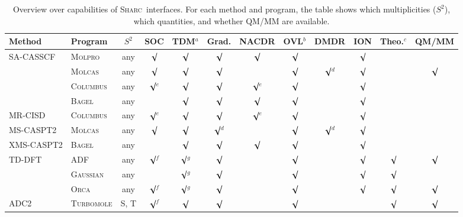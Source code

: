 \documentclass[a4paper,10pt,DIV=15,openany]{scrbook}
\newcommand{\sharc}{\textsc{Sharc}}
\begin{document}
\begin{table}[htb]
  \newcommand{\chk}{\ensuremath{\surd}}
  \renewcommand{\tabcolsep}{4.5pt}
  \centering
  \caption[Overview over capabilities of \sharc\ interfaces.]{Overview over capabilities of \sharc\ interfaces. For each method and program, the table shows which multiplicities ($S^2$), which quantities, and whether QM/MM are available.}
  \label{tab:interfaces}
  \begin{tabular}{ll cccccccccc}
    \hline
    Method      &Program              &$S^2$   &SOC         &TDM$^a$     &Grad.       &NACDR       &OVL$^b$ &DMDR     &ION  &Theo.$^c$   &QM/MM\\
    \hline
    SA-CASSCF   &\textsc{Molpro}      &any     &\chk        &\chk        &\chk        &\chk        &\chk    &         &\chk &            &     \\
                &\textsc{Molcas}      &any     &\chk        &\chk        &\chk        &            &\chk    &\chk$^d$ &\chk &            &\chk \\
                &\textsc{Columbus}    &any     &\chk$^e$    &\chk        &\chk        &\chk$^e$    &\chk    &         &\chk &            &     \\
                &\textsc{Bagel}       &any     &            &\chk        &\chk        &\chk        &\chk    &         &\chk &            &     \\
    MR-CISD     &\textsc{Columbus}    &any     &\chk$^e$    &\chk        &\chk        &\chk$^e$    &\chk    &         &\chk &            &     \\
    MS-CASPT2   &\textsc{Molcas}      &any     &\chk        &\chk        &\chk$^d$    &            &\chk    &\chk$^d$ &\chk &            &     \\
    XMS-CASPT2  &\textsc{Bagel}       &any     &            &\chk        &\chk        &\chk        &\chk    &         &\chk &            &     \\
    TD-DFT      &\textsc{ADF}         &any     &\chk$^f$    &\chk$^g$    &\chk        &            &\chk    &         &\chk &\chk        &\chk \\
                &\textsc{Gaussian}    &any     &            &\chk$^g$    &\chk        &            &\chk    &         &\chk &\chk        &     \\
                &\textsc{Orca}        &any     &\chk$^f$    &\chk$^g$    &\chk        &            &\chk    &         &\chk &\chk        &\chk \\
    ADC2        &\textsc{Turbomole}   &S, T    &\chk$^f$    &\chk        &\chk        &            &\chk    &         &     &\chk        &\chk \\

\end{tabular}
\end{table}
\end{document}
